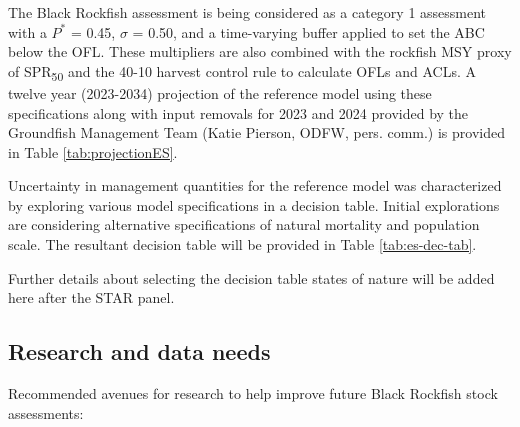 \documentclass[11pt,
  english,
  letterpaper,
]{article}
\begin{document}
The Black Rockfish assessment is being considered as a category 1 assessment with a \(P^*\) = 0.45, \(\sigma\) = 0.50, and a time-varying buffer applied to set the ABC below the OFL. These multipliers are also combined with the rockfish MSY proxy of SPR\textsubscript{50} and the 40-10 harvest control rule to calculate OFLs and ACLs. A twelve year (2023-2034) projection of the reference model using these specifications along with input removals for 2023 and 2024 provided by the Groundfish Management Team (Katie Pierson, ODFW, pers. comm.) is provided in Table \ref{tab:projectionES}.



Uncertainty in management quantities for the reference model was characterized by exploring various model specifications in a decision table. Initial explorations are considering alternative specifications of natural mortality and population scale. The resultant decision table will be provided in Table \ref{tab:es-dec-tab}.

Further details about selecting the decision table states of nature will be added here after the STAR panel.

\clearpage



\clearpage

\hypertarget{research-and-data-needs}{%
\subsection*{Research and data needs}\label{research-and-data-needs}}

Recommended avenues for research to help improve future Black Rockfish stock assessments:
\end{document}
